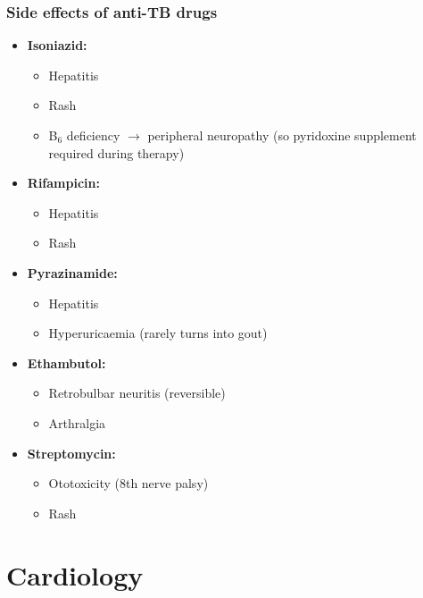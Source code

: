 \documentclass[
  12pt,
]{memoir}
\providecommand{\tightlist}{%
  \setlength{\itemsep}{0pt}\setlength{\parskip}{0pt}}
\begin{document}
\hypertarget{side-effects-of-anti-tb-drugs}{%
\subsection{Side effects of anti-TB
drugs}\label{side-effects-of-anti-tb-drugs}}

\begin{itemize}
\tightlist
\item
  \textbf{Isoniazid:}

  \begin{itemize}
  \tightlist
  \item
    Hepatitis
  \item
    Rash
  \item
    B\(_6\) deficiency \(\rightarrow\) peripheral neuropathy (so
    pyridoxine supplement required during therapy)
  \end{itemize}
\item
  \textbf{Rifampicin:}

  \begin{itemize}
  \tightlist
  \item
    Hepatitis
  \item
    Rash
  \end{itemize}
\item
  \textbf{Pyrazinamide:}

  \begin{itemize}
  \tightlist
  \item
    Hepatitis
  \item
    Hyperuricaemia (rarely turns into gout)
  \end{itemize}
\item
  \textbf{Ethambutol:}

  \begin{itemize}
  \tightlist
  \item
    Retrobulbar neuritis (reversible)
  \item
    Arthralgia
  \end{itemize}
\item
  \textbf{Streptomycin:}

  \begin{itemize}
  \tightlist
  \item
    Ototoxicity (8th nerve palsy)
  \item
    Rash
  \end{itemize}
\end{itemize}

\pagebreak

\hypertarget{cardiology}{%
\chapter{Cardiology}\label{cardiology}}
\end{document}
